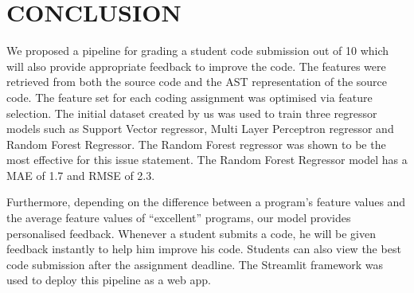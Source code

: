 \chapter{CONCLUSION}

We proposed a pipeline for grading a student code submission out of 10
which will also provide appropriate feedback to improve the code. The
features were retrieved from both the source code and the AST
representation of the source code. The feature set for each coding
assignment was optimised via feature selection. The initial dataset
created by us was used to train three regressor models such as Support
Vector regressor, Multi Layer Perceptron regressor and Random Forest
Regressor. The Random Forest regressor was shown to be the most
effective for this issue statement. The Random Forest Regressor model
has a MAE of 1.7 and RMSE of 2.3.

Furthermore, depending on the difference between a program's feature
values and the average feature values of ``excellent'' programs, our
model provides personalised feedback.  Whenever a student submits a
code, he will be given feedback instantly to help him improve his
code.  Students can also view the best code submission after the
assignment deadline. The Streamlit framework was used to deploy this
pipeline as a web app.
